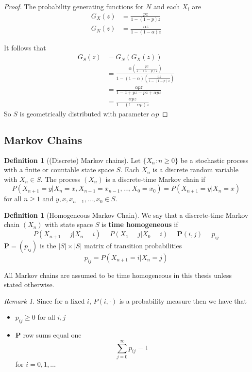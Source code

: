 \documentclass{article}
\theoremstyle{plain}
\theoremstyle{definition}
\newtheorem{defn}[theorem]{Definition}
\theoremstyle{remark}
\newtheorem*{remark}{Remark}
\numberwithin{equation}{section}
\begin{document}
\begin{proof}
The probability generating functions for $N$ and each $X_i$ are
\begin{align*}
    G_X(z) &= \frac{p z}{1 - (1 - p)z}\\
    G_{N}(z) &= \frac{\alpha z}{1 - (1 - \alpha)z}
\end{align*}

It follows that
\begin{align*}
    G_S(z) &= G_N(G_X(z))\\
    &= \frac{
    \alpha \left( \frac{p z}{1 - (1 - p)z} \right)
    }{
        1 - (1 - \alpha) \left( \frac{p z}{1 - (1 - p)z} \right)
    }\\
    &= \frac{
        \alpha p z
    }{
        1 - z + pz - pz + \alpha p z
    } \\
    &= \frac{
        \alpha p z
    }{
        1 - (1 - \alpha p) z
    }
\end{align*}
So $S$ is geometrically distributed with parameter $\alpha p$
\end{proof}

\subsection{Markov Chains}

\begin{defn}[(Discrete) Markov chains] \cite{grimmett2001}
Let $\{X_n : n \geq 0\}$ be a stochastic process with a finite or countable state space $S$.
Each $X_n$ is a discrete random variable with $X_n \in S$.
The process $(X_n)$ is a discrete-time Markov chain if
$$
P(X_{n + 1} = y | X_n = x, X_{n - 1} = x_{n - 1}, \ldots, X_0 = x_0) = P(X_{n + 1} = y | X_n = x)
$$
for all $n \geq 1$ and $y, x, x_{n-1}, \ldots, x_0 \in S$.
\end{defn}

\begin{defn}[Homogeneous Markov Chain]\cite{grimmett2001}
We say that a discrete-time Markov chain $(X_n)$ with state space $S$ is \textbf{time homogeneous} if
$$
P(X_{n + 1} = j | X_n = i) = P(X_{1} = j | X_0 = i) = \mathbf{P}(i,j) = p_{ij}
$$
$\mathbf{P} = (p_{ij})$ is the $|S| \times |S|$ matrix of transition probabilities
$$
p_{ij} = P(X_{n + 1} = i | X_n = j)
$$

All Markov chains are assumed to be time homogeneous in this thesis unless stated otherwise.
\end{defn}

\begin{remark}
Since for a fixed $i$, $P(i, \cdot)$ is a probability measure then we have that
\begin{itemize}
    \item $p_{ij} \geq 0$ for all $i,j$
    \item $\mathbf{P}$ row sums equal one
    $$
    \sum_{j = 0}^\infty p_{ij} = 1
    $$
    for $i = 0, 1, \ldots$
\end{itemize}
\end{remark}
\end{document}
